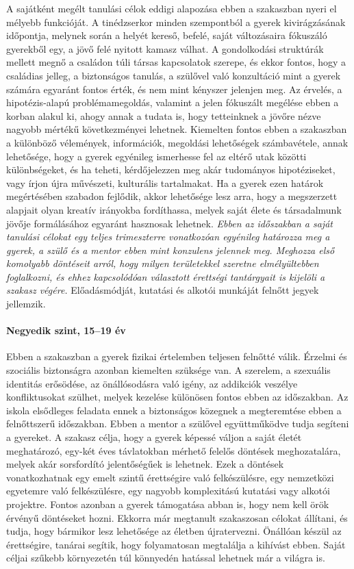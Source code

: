 A sajátként megélt tanulási célok eddigi alapozása ebben a szakaszban nyeri el mélyebb funkcióját. A tinédzserkor minden szempontból a gyerek kivirágzásának időpontja, melynek során a helyét kereső, befelé, saját változásaira fókuszáló gyerekből egy, a jövő felé nyitott kamasz válhat. A gondolkodási struktúrák mellett megnő a családon túli társas kapcsolatok szerepe, és ekkor fontos, hogy a családias jelleg, a biztonságos tanulás, a szülővel való konzultáció mint a gyerek számára egyaránt fontos érték, és nem mint kényszer jelenjen meg. Az érvelés, a hipotézis-alapú problémamegoldás, valamint a jelen fókuszált megélése ebben a korban alakul ki, ahogy annak a tudata is, hogy tetteinknek a jövőre nézve nagyobb mértékű következményei lehetnek. Kiemelten fontos ebben a szakaszban a különböző vélemények, információk, megoldási lehetőségek számba\-vétele, annak lehetősége, hogy a gyerek egyénileg ismerhesse fel az eltérő utak közötti különbségeket, és ha teheti, kérdőjelezzen meg akár tudományos hipotéziseket, vagy írjon újra művészeti, kulturális tartalmakat.
Ha a gyerek ezen határok megértésében szabadon fejlődik, akkor lehetősége lesz arra, hogy a megszerzett alapjait olyan kreatív irányokba fordíthassa, melyek saját élete és társadalmunk jövője formálásához egyaránt hasznosak lehetnek. \emph{Ebben az időszakban a saját tanulási célokat egy teljes trimeszterre vonatkozóan egyénileg határozza meg a gyerek, a szülő és a mentor ebben mint konzulens jelennek meg. Meghozza első komolyabb döntéseit arról, hogy milyen területekkel szeretne elmélyültebben foglalkozni, és ehhez kapcsolódóan választott érettségi tantárgyait is kijelöli a szakasz végére.} Előadásmódját, kutatási és alkotói munkáját felnőtt jegyek jellemzik.

\paragraph{Negyedik szint, 15--19 év} Ebben a szakaszban a gyerek fizikai
értelemben teljesen felnőtté válik. Érzelmi és szociális biztonságra azonban kiemelten szüksége van. A szerelem, a szexuális identitás erősödése, az önállósodásra való igény, az addikciók veszélye konfliktusokat szülhet, melyek kezelése különösen fontos ebben az időszakban. Az iskola elsődleges feladata ennek a biztonságos közegnek a megteremtése ebben a felnőttszerű időszakban. Ebben a mentor a szülővel együttműködve tudja segíteni a gyereket. A szakasz célja, hogy a gyerek képessé váljon a saját életét meghatározó, egy-két éves távlatokban mérhető felelős döntések meghozatalára, melyek akár sorsfordító jelentőségűek is lehetnek. Ezek a döntések  vonatkozhatnak egy emelt szintű érettségire való felkészülésre, egy nemzetközi egyetemre való felkészülésre, egy nagyobb komplexitású kutatási vagy alkotói projektre. Fontos azonban a gyerek támogatása abban is, hogy nem kell örök érvényű döntéseket hozni. Ekkorra már megtanult szakaszosan célokat állítani, és tudja, hogy bármikor lesz lehetősége az életben újratervezni. Önállóan készül az érettségire, tanárai segítik, hogy folyamatosan megtalálja a kihívást ebben. Saját céljai szűkebb környezetén túl könnyedén hatással lehetnek már a világra is.\vfill\eject
